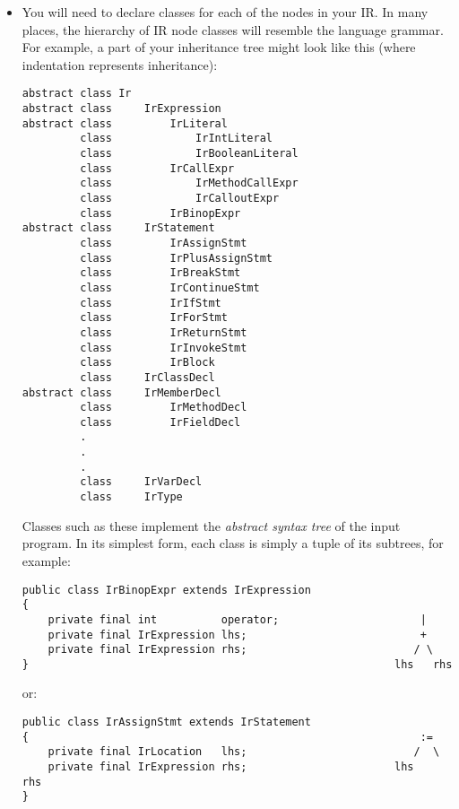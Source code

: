 \begin{itemize}

\item
You will need to declare classes for each of the nodes in your IR.  In
many places, the hierarchy of IR node classes will resemble the
language grammar.  For example, a part of your inheritance tree might
look like this (where indentation represents inheritance):


\begin{small}\begin{verbatim}
abstract class Ir
abstract class     IrExpression
abstract class         IrLiteral
         class             IrIntLiteral
         class             IrBooleanLiteral
         class         IrCallExpr
         class             IrMethodCallExpr
         class             IrCalloutExpr
         class         IrBinopExpr
abstract class     IrStatement
         class         IrAssignStmt
         class         IrPlusAssignStmt
         class         IrBreakStmt
         class         IrContinueStmt
         class         IrIfStmt
         class         IrForStmt
         class         IrReturnStmt
         class         IrInvokeStmt
         class         IrBlock
         class     IrClassDecl
abstract class     IrMemberDecl
         class         IrMethodDecl
         class         IrFieldDecl
         .
         .
         .
         class     IrVarDecl
         class     IrType
\end{verbatim}\end{small}

Classes such as these implement the {\it abstract syntax tree} of
the input program.  In its simplest form, each class is simply a tuple
of its subtrees, for example:

\begin{small}\begin{verbatim}
public class IrBinopExpr extends IrExpression
{
    private final int          operator;                      |
    private final IrExpression lhs;                           +
    private final IrExpression rhs;                          / \
}                                                         lhs   rhs
\end{verbatim}\end{small}

\noindent or:

\begin{small}\begin{verbatim}
public class IrAssignStmt extends IrStatement
{                                                             :=
    private final IrLocation   lhs;                          /  \
    private final IrExpression rhs;                       lhs    rhs
}
\end{verbatim}\end{small}


\end{itemize}
